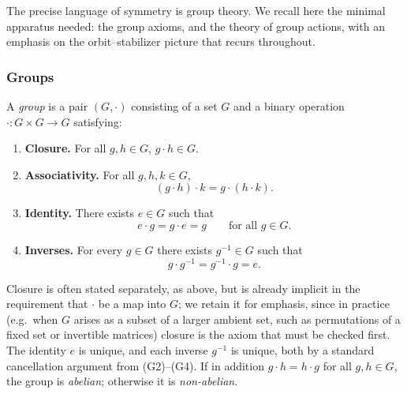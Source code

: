 \documentclass[mathematics,review,submit,moreauthors]{Definitions/mdpi}
\begin{document}
The precise language of symmetry is group theory.
We recall here the minimal apparatus needed: the group axioms, and the theory of group actions, with an emphasis on the orbit--stabilizer picture that recurs throughout.

\subsubsection{Groups}\label{subsec:groups}

\begin{Definition}[Group]\label{def:group}
A \emph{group} is a pair $(G, \cdot)$ consisting of a set $G$ and a binary
operation $\cdot : G \times G \to G$ satisfying:
    \begin{enumerate}[label=(G\arabic*), leftmargin=*, labelsep=0.5em]
        \item \textbf{Closure.} For all $g, h \in G$, $g \cdot h \in G$.
        \item \textbf{Associativity.} For all $g, h, k \in G$,
        \[
            (g \cdot h) \cdot k = g \cdot (h \cdot k).
        \]
        \item \textbf{Identity.} There exists $e \in G$ such that
        \[
            e \cdot g = g \cdot e = g \qquad \text{for all } g \in G.
        \]
        \item \textbf{Inverses.} For every $g \in G$ there exists
        $g^{-1} \in G$ such that
        \[
            g \cdot g^{-1} = g^{-1} \cdot g = e.
        \]
    \end{enumerate}
\end{Definition}

Closure is often stated separately, as above, but is already implicit in the
requirement that $\cdot$ be a map into $G$; we retain it for emphasis, since
in practice (e.g.\ when $G$ arises as a subset of a larger ambient set, such
as permutations of a fixed set or invertible matrices) closure is the axiom
that must be checked first. The identity $e$ is unique, and each inverse
$g^{-1}$ is unique, both by a standard cancellation argument from (G2)--(G4).
If in addition $g \cdot h = h \cdot g$ for all $g,h \in G$, the group is
\emph{abelian}; otherwise it is \emph{non-abelian}.
\end{document}
